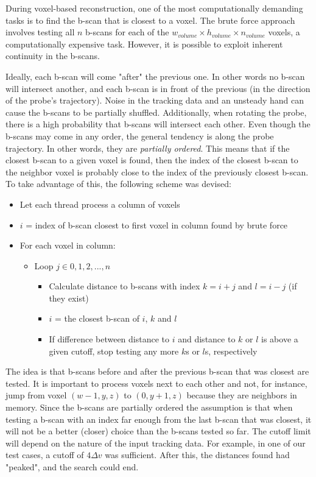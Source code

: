 	During voxel-based reconstruction, one of the most computationally demanding tasks is to find the b-scan that is closest to a voxel. The brute force approach involves testing all $n$ b-scans for each of the $w_{volume} \times h_{volume} \times n_{volume}$ voxels, a computationally expensive task. However, it is possible to exploit inherent continuity in the b-scans.
	
	
	Ideally, each b-scan will come "after" the previous one. In other words no b-scan will intersect another, and each b-scan is in front of the previous (in the direction of the probe's trajectory). Noise in the tracking data and an unsteady hand can cause the b-scans to be partially shuffled. Additionally, when rotating the probe, there is a high probability that b-scans will intersect each other. Even though the b-scans may come in any order, the general tendency is along the probe trajectory. In other words, they are \emph{partially ordered}. This means that if the closest b-scan to a given voxel is found, then the index of the closest b-scan to the neighbor voxel is probably close to the index of the previously closest b-scan. To take advantage of this, the following scheme was devised:
	
	\begin{itemize}
		\item Let each thread process a column of voxels
		\item $i$ = index of b-scan closest to first voxel in column found by brute force
		\item For each voxel in column:
		\begin{itemize}
			\item Loop $j \in {0, 1, 2, ..., n}$
			\begin{itemize}
				\item Calculate distance to b-scans with index $k=i+j$ and $l=i-j$ (if they exist)
				\item $i$ = the closest b-scan of $i$, $k$ and $l$
				\item If difference between distance to $i$ and distance to $k$ or $l$ is above a given cutoff, stop testing any more $k$s or $l$s, respectively
			\end{itemize}
		\end{itemize}
	\end{itemize}
	
	The idea is that b-scans before and after the previous b-scan that was closest are tested. It is important to process voxels next to each other and not, for instance, jump from voxel $(w-1,y,z)$ to $(0,y+1,z)$ because they are neighbors in memory. Since the b-scans are partially ordered the assumption is that when testing a  b-scan with an index far enough from the last b-scan that was closest, it will not be a better (closer) choice than the b-scans tested so far. The cutoff limit will depend on the nature of the input tracking data. For example, in one of our test cases, a cutoff of $4\Delta v$ was sufficient. After this, the distances found had "peaked", and the search could end.